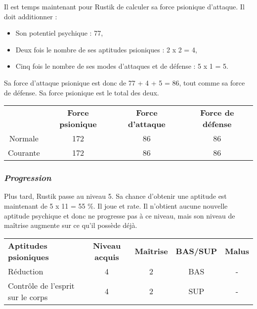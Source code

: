 \bigskip

Il est temps maintenant pour Rustik de calculer sa force psionique d'attaque. Il doit additionner :

\bigskip

\begin{itemize}
\item Son potentiel psychique : 77,
\item Deux fois le nombre de ses aptitudes psioniques : 2 x 2 = 4,
\item Cinq fois le nombre de ses modes d'attaques et de défense : 5 x 1 = 5.
\end{itemize}

\bigskip

Sa force d'attaque psionique est donc de 77 + 4 + 5 = 86, tout comme sa force de défense. Sa force psionique est le total des deux.

\bigskip

\begin{tabular}{cccc}
& \textbf{Force psionique} & \textbf{Force d'attaque} & \textbf{Force de défense}  \\
Normale & 172 & 86 & 86 \\
Courante & 172 & 86 & 86 \\
\end{tabular}



\subsubsection*{\textit{Progression}}

Plus tard, Rustik passe au niveau 5. Sa chance d'obtenir une aptitude est maintenant de 5 x 11 = 55 \%. Il joue et rate. Il n'obtient aucune nouvelle aptitude psychique et donc ne progresse pas à ce niveau, mais son niveau de maîtrise augmente sur ce qu'il possède déjà.

\bigskip

\begin{tabular}{lcccc}
\textbf{Aptitudes psioniques} & \textbf{Niveau acquis} & \textbf{Maîtrise}  & \textbf{BAS/SUP} & \textbf{Malus} \\
Réduction                         & 4 & 2 & BAS & - \\
Contrôle de l'esprit sur le corps & 4 & 2 & SUP & - \\
\end{tabular}


